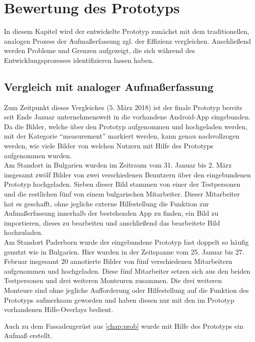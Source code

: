 \chapter{Bewertung des Prototyps}
In diesem Kapitel wird der entwickelte Prototyp zunächst mit dem traditionellen, analogen Prozess der Aufmaßerfassung zgl. der Effizienz vergleichen.
Anschließend werden Probleme und Grenzen aufgezeigt, die sich während des Entwicklungsprozesses identifizieren lassen haben.

\section{Vergleich mit analoger Aufmaßerfassung}
Zum Zeitpunkt dieses Vergleiches (5. März 2018) ist der finale Prototyp bereits seit Ende Januar unternehmensweit in die vorhandene Android-App eingebunden.
Da die Bilder, welche über den Prototyp aufgenommen und hochgeladen werden, mit der Kategorie ``measurement'' markiert werden, kann genau nachvollzogen werden, wie viele Bilder von welchen Nutzern mit Hilfe des Prototyps aufgenommen wurden. \\

Am Standort in Bulgarien wurden im Zeitraum vom 31. Januar bis 2. März insgesamt zwölf Bilder von zwei verschiedenen Benutzern über den eingebundenen Prototyp hochgeladen.
Sieben dieser Bild stammen von einer der Testpersonen und die restlichen fünf von einem bulgarischen Mitarbeiter.
Dieser Mitarbeiter hat es geschafft, ohne jegliche externe Hilfestellung die Funktion zur Aufmaßerfassung innerhalb der bestehenden App zu finden, ein Bild zu importieren, dieses zu bearbeiten und anschließend das bearbeitete Bild hochzuladen. 
 \\

Am Standort Paderborn wurde der eingebundene Prototyp fast doppelt so häufig genutzt wie in Bulgarien.
Hier wurden in der Zeitspanne vom 25. Januar bis 27. Februar insgesamt 20 annotierte Bilder von fünf verschiedenen Mitarbeitern aufgenommen und hochgeladen.
Diese fünf Mitarbeiter setzen sich aus den beiden Testpersonen und drei weiteren Monteuren zusammen.
Die drei weiteren Monteure sind ohne jegliche Aufforderung oder Hilfestellung auf die Funktion des Prototyps aufmerksam geworden und haben diesen nur mit den im Prototyp vorhandenen Hilfe-Overlays bedient.

Auch zu dem Fassadengerüst aus \autoref{chap:prob} wurde mit Hilfe des Prototyps ein Aufmaß erstellt.

